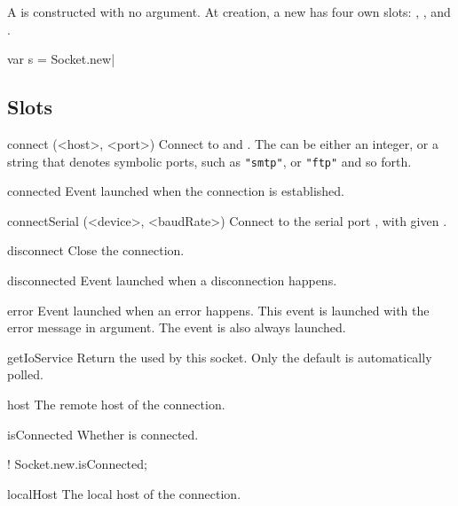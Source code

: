 A  is constructed with no argument. At creation, a
new  has four own slots: ,
,  and .

\begin{urbiscript}
var s = Socket.new|
\end{urbiscript}

\subsection{Slots}
\begin{urbiscriptapi}
\item[connect](<host>, <port>)%
  Connect \this to  and .  The
   can be either an integer, or a string that denotes
  symbolic ports, such as \lstinline|"smtp"|, or \lstinline|"ftp"| and
  so forth.


\item[connected]%
  Event launched when the connection is established.


\item[connectSerial](<device>, <baudRate>)%
  Connect \this to the serial port , with given
  .


\item[disconnect]%
  Close the connection.


\item[disconnected]
  Event launched when a disconnection happens.


\item[error]
  Event launched when an error happens. This event is launched with
  the error message in argument. The event  is
  also always launched.


\item[getIoService] Return the  used by this
  socket. Only the default  is automatically polled.


\item[host]
  The remote host of the connection.


\item[isConnected]
  Whether \this is connected.
\begin{urbiassert}
! Socket.new.isConnected;
\end{urbiassert}

\item[localHost]
  The local host of the connection.



\end{urbiscriptapi}
